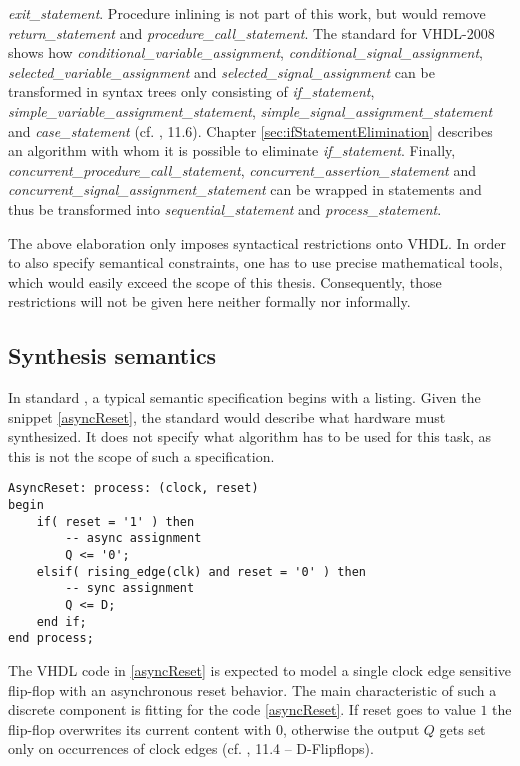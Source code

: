 \emph{exit_statement}. Procedure inlining is not part of this work,
but would remove \emph{return_statement} and
\emph{procedure_call_statement}. The standard for VHDL-2008 shows how
\emph{conditional_variable_assignment},
\emph{conditional_signal_assignment},
\emph{selected_variable_assignment} and
\emph{selected_signal_assignment} can be transformed in syntax trees
only consisting of \emph{if_statement},
\emph{simple_variable_assignment_statement},
\emph{simple_signal_assignment_statement} and
\emph{case_statement} (cf. \cite{IEEELRM}, 11.6). Chapter
\ref{sec:ifStatementElimination}
describes an algorithm with whom it is possible to eliminate
\emph{if_statement}. Finally,
\emph{concurrent_procedure_call_statement},
\emph{concurrent_assertion_statement} and
\emph{concurrent_signal_assignment_statement} can be wrapped in
 statements and thus be transformed into
\emph{sequential_statement} and \emph{process_statement}.

The above elaboration only imposes syntactical restrictions onto
VHDL. In order to also specify semantical constraints, one has to use
precise mathematical tools, which would easily exceed the scope of
this thesis. Consequently, those restrictions will not be given here
neither formally nor informally.

\subsection{Synthesis semantics}

In standard \cite{IEEESYNTH}, a typical semantic specification begins
with a listing.
Given the snippet \ref{asyncReset}, the standard would describe what hardware
must synthesized. It does not specify what algorithm has to be used
for this task, as this is not the scope of such a specification.
%
\begin{lstlisting}[style=vhdl,caption={A typical IEEE 1076.6 code
      snippet},label={asyncReset}]
AsyncReset: process: (clock, reset)
begin
    if( reset = '1' ) then
        -- async assignment
        Q <= '0';
    elsif( rising_edge(clk) and reset = '0' ) then
        -- sync assignment
        Q <= D;
    end if;
end process;
\end{lstlisting}
%
The VHDL code in \ref{asyncReset} is expected to model a single clock
edge sensitive flip-flop with an asynchronous reset behavior.
The main characteristic of such a discrete component is fitting for
the code \ref{asyncReset}. If reset goes to value \(1\) the flip-flop
overwrites its current content with \(0\), otherwise the output \(Q\)
gets set only on occurrences of clock edges (cf. \cite{DIGITALTECHNIK},
11.4 -- D-Flipflops).

